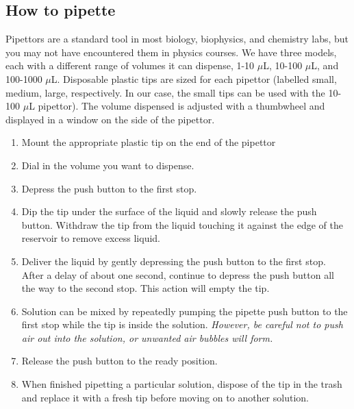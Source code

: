 \documentclass{../lab}
\begin{document}

\subsection{How to pipette}

Pipettors are a standard tool in most biology, biophysics, and chemistry labs, but you may not have encountered them in physics courses. We have three models, each with a different range of volumes it can dispense, 1-10 $\mu$L, 10-100 $\mu$L, and 100-1000 $\mu$L. Disposable plastic tips are sized for each pipettor (labelled small, medium, large, respectively. In our case, the small tips can be used with the 10-100 $\mu$L pipettor). The volume dispensed is adjusted with a thumbwheel and displayed in a window on the side of the pipettor.

\begin{enumerate}
    \item Mount the appropriate plastic tip on the end of the pipettor

    \item Dial in the volume you want to dispense.

    \item Depress the push button to the first stop.

    \item Dip the tip under the surface of the liquid and slowly release the push button. Withdraw the tip from the liquid touching it against the edge of the reservoir to remove excess liquid.

    \item Deliver the liquid by gently depressing the push button to the first stop. After a delay of about one second, continue to depress the push button all the way to the second stop. This action will empty the tip.

    \item Solution can be mixed by repeatedly pumping the pipette push button to the first stop while the tip is inside the solution. \emph{However, be careful not to push air out into the solution, or unwanted air bubbles will form.}

    \item Release the push button to the ready position.

    \item When finished pipetting a particular solution, dispose of the tip in the trash and replace it with a fresh tip before moving on to another solution.
\end{enumerate}
\end{document}
